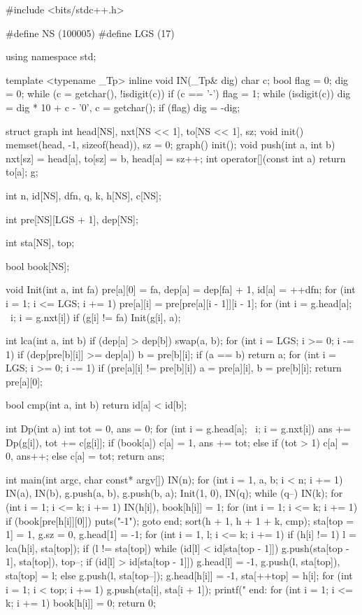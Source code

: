 \begin{cppcode}
#include <bits/stdc++.h>

#define NS (100005)
#define LGS (17)

using namespace std;

template <typename _Tp>
inline void IN(_Tp& dig) {
  char c;
  bool flag = 0;
  dig = 0;
  while (c = getchar(), !isdigit(c))
    if (c == '-') flag = 1;
  while (isdigit(c)) dig = dig * 10 + c - '0', c = getchar();
  if (flag) dig = -dig;
}

struct graph {
  int head[NS], nxt[NS << 1], to[NS << 1], sz;
  void init() { memset(head, -1, sizeof(head)), sz = 0; }
  graph() { init(); }
  void push(int a, int b) { nxt[sz] = head[a], to[sz] = b, head[a] = sz++; }
  int operator[](const int a) { return to[a]; }
} g;

int n, id[NS], dfn, q, k, h[NS], c[NS];

int pre[NS][LGS + 1], dep[NS];

int sta[NS], top;

bool book[NS];

void Init(int a, int fa) {
  pre[a][0] = fa, dep[a] = dep[fa] + 1, id[a] = ++dfn;
  for (int i = 1; i <= LGS; i += 1) pre[a][i] = pre[pre[a][i - 1]][i - 1];
  for (int i = g.head[a]; ~i; i = g.nxt[i])
    if (g[i] != fa) Init(g[i], a);
}

int lca(int a, int b) {
  if (dep[a] > dep[b]) swap(a, b);
  for (int i = LGS; i >= 0; i -= 1)
    if (dep[pre[b][i]] >= dep[a]) b = pre[b][i];
  if (a == b) return a;
  for (int i = LGS; i >= 0; i -= 1)
    if (pre[a][i] != pre[b][i]) a = pre[a][i], b = pre[b][i];
  return pre[a][0];
}

bool cmp(int a, int b) { return id[a] < id[b]; }

int Dp(int a) {
  int tot = 0, ans = 0;
  for (int i = g.head[a]; ~i; i = g.nxt[i]) ans += Dp(g[i]), tot += c[g[i]];
  if (book[a])
    c[a] = 1, ans += tot;
  else if (tot > 1)
    c[a] = 0, ans++;
  else
    c[a] = tot;
  return ans;
}

int main(int argc, char const* argv[]) {
  IN(n);
  for (int i = 1, a, b; i < n; i += 1) IN(a), IN(b), g.push(a, b), g.push(b, a);
  Init(1, 0), IN(q);
  while (q--) {
    IN(k);
    for (int i = 1; i <= k; i += 1) IN(h[i]), book[h[i]] = 1;
    for (int i = 1; i <= k; i += 1)
      if (book[pre[h[i]][0]]) {
        puts("-1");
        goto end;
      }
    sort(h + 1, h + 1 + k, cmp);
    sta[top = 1] = 1, g.sz = 0, g.head[1] = -1;
    for (int i = 1, l; i <= k; i += 1)
      if (h[i] != 1) {
        l = lca(h[i], sta[top]);
        if (l != sta[top]) {
          while (id[l] < id[sta[top - 1]])
            g.push(sta[top - 1], sta[top]), top--;
          if (id[l] > id[sta[top - 1]])
            g.head[l] = -1, g.push(l, sta[top]), sta[top] = l;
          else
            g.push(l, sta[top--]);
        }
        g.head[h[i]] = -1, sta[++top] = h[i];
      }
    for (int i = 1; i < top; i += 1) g.push(sta[i], sta[i + 1]);
    printf("%
  end:
    for (int i = 1; i <= k; i += 1) book[h[i]] = 0;
  }
  return 0;
}
\end{cppcode}

